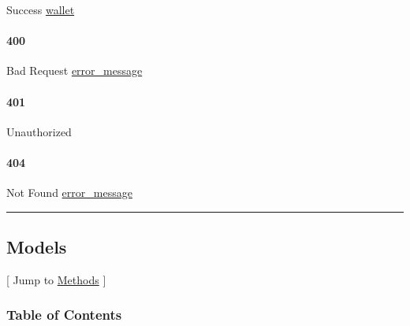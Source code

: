 Success \protect\hyperlink{wallet}{wallet}

\hypertarget{section-631}{%
\paragraph{400}\label{section-631}}

Bad Request \protect\hyperlink{error_message}{error\_message}

\hypertarget{section-632}{%
\paragraph{401}\label{section-632}}

Unauthorized \protect\hyperlink{}{}

\hypertarget{section-633}{%
\paragraph{404}\label{section-633}}

Not Found \protect\hyperlink{error_message}{error\_message}

\begin{center}\rule{0.5\linewidth}{\linethickness}\end{center}

\hypertarget{models}{%
\subsection{\texorpdfstring{\protect\hypertarget{__Models}{}{Models}}{Models}}\label{models}}

{[} Jump to \protect\hyperlink{__Methods}{Methods} {]}

\hypertarget{table-of-contents-1}{%
\subsubsection{Table of Contents}\label{table-of-contents-1}}

